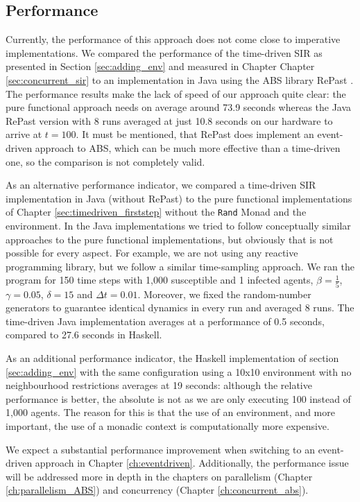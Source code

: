 \subsection{Performance}
Currently, the performance of this approach does not come close to imperative implementations. We compared the performance of the time-driven SIR as presented in Section \ref{sec:adding_env} and measured in Chapter Chapter \ref{sec:concurrent_sir} to an implementation in Java using the ABS library RePast \cite{north_complex_2013}. The performance results make the lack of speed of our approach quite clear: the pure functional approach needs on average around 73.9 seconds whereas the Java RePast version with 8 runs averaged at just 10.8 seconds on our hardware to arrive at $t = 100$. It must be mentioned, that RePast does implement an event-driven approach to ABS, which can be much more effective \cite{meyer_event-driven_2014} than a time-driven one, so the comparison is not completely valid.

As an alternative performance indicator, we compared a time-driven SIR implementation in Java (without RePast) to the pure functional implementations of Chapter \ref{sec:timedriven_firststep} without the \texttt{Rand} Monad and the environment. In the Java implementations we tried to follow conceptually similar approaches to the pure functional implementations, but obviously that is not possible for every aspect. For example, we are not using any reactive programming library, but we follow a similar time-sampling approach. We ran the program for 150 time steps with 1,000 susceptible and 1 infected agents, $\beta = \frac{1}{5}$, $\gamma = 0.05$, $\delta = 15$ and $\Delta t = 0.01$. Moreover, we fixed the random-number generators to guarantee identical dynamics in every run and averaged 8 runs. The time-driven Java implementation averages at a performance of 0.5 seconds, compared to 27.6 seconds in Haskell.

As an additional performance indicator, the Haskell implementation of section \ref{sec:adding_env} with the same configuration using a 10x10 environment with no neighbourhood restrictions averages at 19 seconds: although the relative performance is better, the absolute is not as we are only executing 100 instead of 1,000 agents. The reason for this is that the use of an environment, and more important, the use of a monadic context is computationally more expensive.

We expect a substantial performance improvement when switching to an event-driven approach \cite{meyer_event-driven_2014} in Chapter \ref{ch:eventdriven}. Additionally, the performance issue will be addressed more in depth in the chapters on parallelism (Chapter \ref{ch:parallelism_ABS}) and concurrency (Chapter \ref{ch:concurrent_abs}).